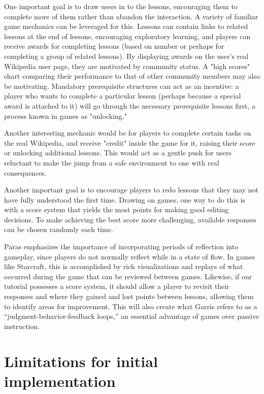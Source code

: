 \documentclass{acm_proc_article-sp}
\begin{document}
One important goal is to draw users in to the lessons, encouraging them to complete more of them rather than abandon the interaction. A variety of familiar game mechanics can be leveraged for this. Lessons can contain links to related lessons at the end of lessons, encouraging exploratory learning, and players can receive awards for completing lessons (based on number or perhaps for completing a group of related lessons). By displaying awards on the user's real Wikipedia user page, they are motivated by community status. A "high scores" chart comparing their performance to that of other community members may also be motivating. Mandatory prerequisite structures can act as an incentive: a player who wants to complete a particular lesson (perhaps because a special award is attached to it) will go through the necessary prerequisite lessons first, a process known in games as "unlocking."

Another interesting mechanic would be for players to complete certain tasks on the real Wikipedia, and receive "credit" inside the game for it, raising their score or unlocking additional lessons. This would act as a gentle push for users reluctant to make the jump from a safe environment to one with real consequences.

Another important goal is to encourage players to redo lessons that they may not have fully understood the first time. Drawing on games, one way to do this is with a score system that yields the most points for making good editing decisions. To make achieving the best score more challenging, available responses can be chosen randomly each time.

Paras\cite{Paras:2005} emphasizes the importance of incorporating periods of reflection into gameplay, since players do not normally reflect while in a state of flow. In games like Starcraft, this is accomplished by rich visualizations and replays of what occurred during the game that can be reviewed between games. Likewise, if our tutorial possesses a score system, it should allow a player to revisit their responses and where they gained and lost points between lessons, allowing them to identify areas for improvement. This will also create what Garris\cite{Garris:2002} refers to as a ``judgment-behavior-feedback loops,'' an essential advantage of games over passive instruction.

\section{Limitations for initial implementation}
\end{document}
